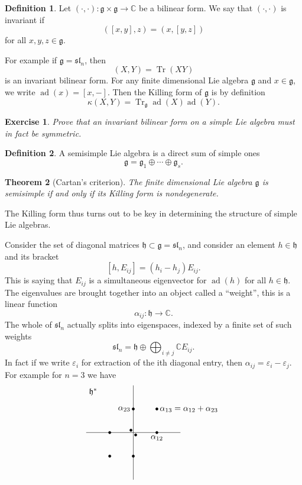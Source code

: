\documentclass[12pt]{article}
\theoremstyle{plain}
\newtheorem{thm}{Theorem}[section]
\newtheorem{exer}[thm]{Exercise}
\theoremstyle{definition}
\newtheorem{defn}{Definition}[section]
\numberwithin{equation}{section}
\DeclareMathOperator{\ad}{ad}
\DeclareMathOperator{\tr}{Tr}
\newcommand{\C}{\mathbb{C}}
\newcommand{\g}{\mathfrak{g}}
\newcommand{\h}{\mathfrak{h}}
\newcommand{\sll}{\mathfrak{sl}}
\begin{document}

\begin{defn}
Let $(\cdot, \cdot) : \g \times \g \rightarrow \C$ be a bilinear form. We say that $(\cdot, \cdot)$ is invariant if
\[
([x, y], z) = (x, [y, z])
\]
for all $x, y, z \in \g$.
\end{defn}
For example if $\g = \sll_n$, then
\[
(X, Y) = \tr(XY)
\]
is an invariant bilinear form.  For any finite dimensional Lie algebra $\g$ and $x \in \g$, we write $\ad(x) = [x, -]$. Then the Killing form of $\g$ is by definition
\[
\kappa(X, Y) = \tr_\g \ad(X) \ad(Y).
\]
\begin{exer}
Prove that an invariant bilinear form on a simple Lie algebra must in fact be symmetric.
\end{exer}

\begin{defn}
A semisimple Lie algebra is a direct sum of simple ones
\[
\g = \g_1 \oplus \cdots \oplus \g_s.
\]
\end{defn}
\begin{thm}[Cartan's criterion]
The finite dimensional Lie algebra $\g$ is semisimple if and only if its Killing form is nondegenerate.
\end{thm}
The Killing form thus turns out to be key in determining the structure of simple Lie algebras.

Consider the set of diagonal matrices $\h \subset \g = \sll_n$, and consider an element $h \in \h$ and its bracket
\[
[h, E_{ij}] = (h_i - h_j) E_{ij}.
\]
This is saying that $E_{ij}$ is a simultaneous eigenvector for $\ad(h)$ for all $h \in \h$. The eigenvalues are brought together into an object called a ``weight'', this is a linear function
\[
\alpha_{ij} : \h \rightarrow \C.
\]
The whole of $\sll_n$ actually splits into eigenspaces, indexed by a finite set of such weights
\[
\sll_n = \h \oplus \bigoplus_{i \neq j} \C E_{ij}.
\]
In fact if we write $\varepsilon_i$ for extraction of the ith diagonal entry, then $\alpha_{ij} = \varepsilon_i - \varepsilon_j$.
For example for $n=3$ we have
\[
\begin{tikzpicture}
	\draw[] (0,-2) -- (0,2) (-2,0) -- (2,0);
	\draw[fill] (-0.1,0.1) circle(1.5pt) (0.1,-0.1) circle(1.5pt) (1,0) circle(1.5pt) node[below]{$\alpha_{12}$} (0,1) circle(1.5pt) node[left]{$\alpha_{23}$} (1,1) circle(1.5pt) node[right]{$\alpha_{13} = \alpha_{12} + \alpha_{23}$} (-1,0) circle(1.5pt) (0,-1) circle(1.5pt) (-1,-1) circle(1.5pt);
	\node[anchor = north west] at (-2,2) {$\h^\ast$};
\end{tikzpicture}
\]
\end{document}

